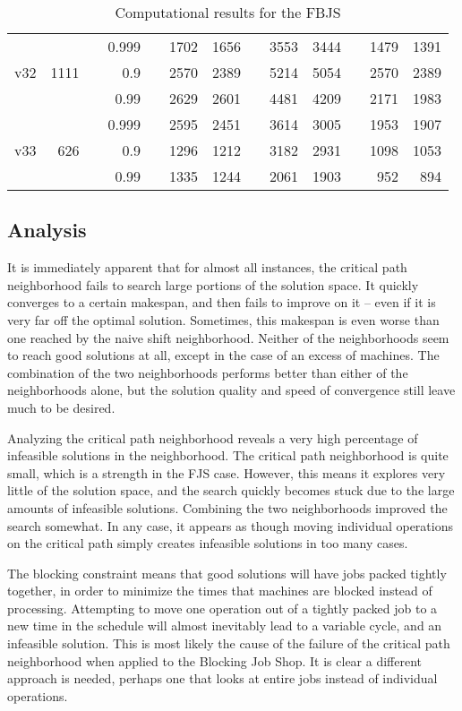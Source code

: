 \documentclass[a4paper,11pt]{article}
\begin{document}
\begin{table}
\begin{tabular}{@{\bfseries}rrrrrrrrrrrrr}
	     &      &      & 0.999 && 1702 & 1656 && 3553 & 3444 && 1479 & 1391 \\[1ex]
	v32  & 1111 &      &   0.9 && 2570 & 2389 && 5214 & 5054 && 2570 & 2389 \\
	     &      &      &  0.99 && 2629 & 2601 && 4481 & 4209 && 2171 & 1983 \\
	     &      &      & 0.999 && 2595 & 2451 && 3614 & 3005 && 1953 & 1907 \\[1ex]
	v33  &  626 &      &   0.9 && 1296 & 1212 && 3182 & 2931 && 1098 & 1053 \\
	     &      &      &  0.99 && 1335 & 1244 && 2061 & 1903 &&  952 &  894 \\
	\bottomrule
\end{tabular}
\caption{Computational results for the FBJS}
\label{table:fbjs}
\end{table}

\subsection{Analysis}

It is immediately apparent that for almost all instances, the critical path neighborhood fails to search large portions of the solution space. It quickly converges to a certain makespan, and then fails to improve on it -- even if it is very far off the optimal solution. Sometimes, this makespan is even worse than one reached by the naive shift neighborhood. Neither of the neighborhoods seem to reach good solutions at all, except in the case of an excess of machines. The combination of the two neighborhoods performs better than either of the neighborhoods alone, but the solution quality and speed of convergence still leave much to be desired.

Analyzing the critical path neighborhood reveals a very high percentage of infeasible solutions in the neighborhood. The critical path neighborhood is quite small, which is a strength in the FJS case. However, this means it explores very little of the solution space, and the search quickly becomes stuck due to the large amounts of infeasible solutions. Combining the two neighborhoods improved the search somewhat. In any case, it appears as though moving individual operations on the critical path simply creates infeasible solutions in too many cases.

The blocking constraint means that good solutions will have jobs packed tightly together, in order to minimize the times that machines are blocked instead of processing. Attempting to move one operation out of a tightly packed job to a new time in the schedule will almost inevitably lead to a variable cycle, and an infeasible solution. This is most likely the cause of the failure of the critical path neighborhood when applied to the Blocking Job Shop. It is clear a different approach is needed, perhaps one that looks at entire jobs instead of individual operations.
\end{document}
